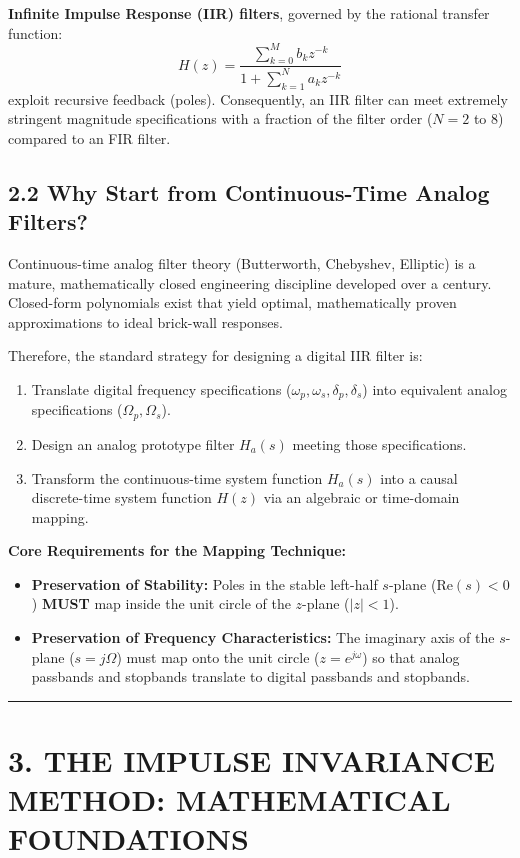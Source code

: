 \documentclass[11pt,a4paper]{article}
\begin{document}
\textbf{Infinite Impulse Response (IIR) filters}, governed by the rational transfer function:
\begin{equation}
H(z) = \frac{\sum_{k=0}^M b_k z^{-k}}{1 + \sum_{k=1}^N a_k z^{-k}}
\end{equation}
exploit recursive feedback (poles). Consequently, an IIR filter can meet extremely stringent magnitude specifications with a fraction of the filter order ($N = 2$ to $8$) compared to an FIR filter.

\subsection{2.2 Why Start from Continuous-Time Analog Filters?}
Continuous-time analog filter theory (Butterworth, Chebyshev, Elliptic) is a mature, mathematically closed engineering discipline developed over a century. Closed-form polynomials exist that yield optimal, mathematically proven approximations to ideal brick-wall responses.

Therefore, the standard strategy for designing a digital IIR filter is:
\begin{enumerate}
    \item Translate digital frequency specifications ($\omega_p, \omega_s, \delta_p, \delta_s$) into equivalent analog specifications ($\Omega_p, \Omega_s$).
    \item Design an analog prototype filter $H_a(s)$ meeting those specifications.
    \item Transform the continuous-time system function $H_a(s)$ into a causal discrete-time system function $H(z)$ via an algebraic or time-domain mapping.
\end{enumerate}

\noindent\textbf{Core Requirements for the Mapping Technique:}
\begin{itemize}
    \item \textbf{Preservation of Stability:} Poles in the stable left-half $s$-plane ($\text{Re}(s) < 0$) \textbf{MUST} map inside the unit circle of the $z$-plane ($|z| < 1$).
    \item \textbf{Preservation of Frequency Characteristics:} The imaginary axis of the $s$-plane ($s = j\Omega$) must map onto the unit circle ($z = e^{j\omega}$) so that analog passbands and stopbands translate to digital passbands and stopbands.
\end{itemize}

\noindent\rule{\textwidth}{0.5pt}

\section{3. THE IMPULSE INVARIANCE METHOD: MATHEMATICAL FOUNDATIONS}
\end{document}
